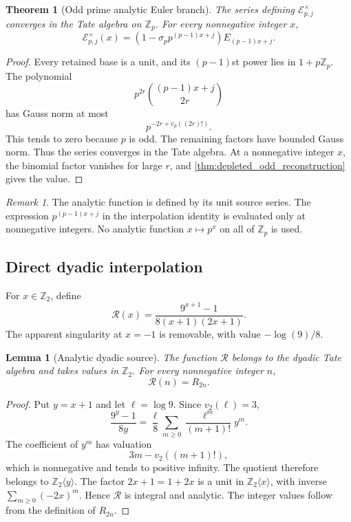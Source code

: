 \documentclass{aomart}
\newtheorem{theorem}{Theorem}[section]
\newtheorem{lemma}[lemma]{Lemma}
\theoremstyle{definition}
\theoremstyle{remark}
\newtheorem{remark}[remark]{Remark}
\newcommand{\Zp}{\mathbb Z_p}
\newcommand{\vp}{v_p}
\newcommand{\vTwo}{v_2}
\begin{document}
\begin{theorem}[Odd prime analytic Euler branch]\label{thm:odd_analytic_branch}
The series defining \(\mathscr E_{p,j}^\times\) converges in the Tate algebra on \(\Zp\). For every nonnegative integer \(x\),
\[
\boxed{
\mathscr E_{p,j}^\times(x)
=
\left(1-\sigma_pp^{(p-1)x+j}\right)
E_{(p-1)x+j}.
}
\]
\end{theorem}

\begin{proof}
Every retained base is a unit, and its \((p-1)\)st power lies in \(1+p\Zp\). The polynomial
\[
p^{2r}\binom{(p-1)x+j}{2r}
\]
has Gauss norm at most
\[
p^{-2r+\vp((2r)!)}.
\]
This tends to zero because \(p\) is odd. The remaining factors have bounded Gauss norm. Thus the series converges in the Tate algebra. At a nonnegative integer \(x\), the binomial factor vanishes for large \(r\), and \cref{thm:depleted_odd_reconstruction} gives the value.
\end{proof}

\begin{remark}\label{rem:depleted_factor_boundary}
The analytic function is defined by its unit source series. The expression \(p^{(p-1)x+j}\) in the interpolation identity is evaluated only at nonnegative integers. No analytic function \(x\mapsto p^x\) on all of \(\Zp\) is used.
\end{remark}

\subsection{Direct dyadic interpolation}

For \(x\in\mathbb Z_2\), define
\[
\boxed{
\mathscr R(x)
=
\frac{9^{x+1}-1}{8(x+1)(2x+1)}.
}
\]
The apparent singularity at \(x=-1\) is removable, with value \(-\log(9)/8\).

\begin{lemma}[Analytic dyadic source]\label{lem:analytic_dyadic_source}
The function \(\mathscr R\) belongs to the dyadic Tate algebra and takes values in \(\mathbb Z_2\). For every nonnegative integer \(n\),
\[
\boxed{\mathscr R(n)=R_{2n}.}
\]
\end{lemma}

\begin{proof}
Put \(y=x+1\) and let \(\ell=\log 9\). Since \(\vTwo(\ell)=3\),
\[
\frac{9^y-1}{8y}
=
\frac{\ell}{8}
\sum_{m\geq0}
\frac{\ell^m}{(m+1)!}y^m.
\]
The coefficient of \(y^m\) has valuation
\[
3m-\vTwo((m+1)!),
\]
which is nonnegative and tends to positive infinity. The quotient therefore belongs to \(\mathbb Z_2\langle y\rangle\). The factor \(2x+1=1+2x\) is a unit in \(\mathbb Z_2\langle x\rangle\), with inverse \(\sum_{m\geq0}(-2x)^m\). Hence \(\mathscr R\) is integral and analytic. The integer values follow from the definition of \(R_{2n}\).
\end{proof}
\end{document}
